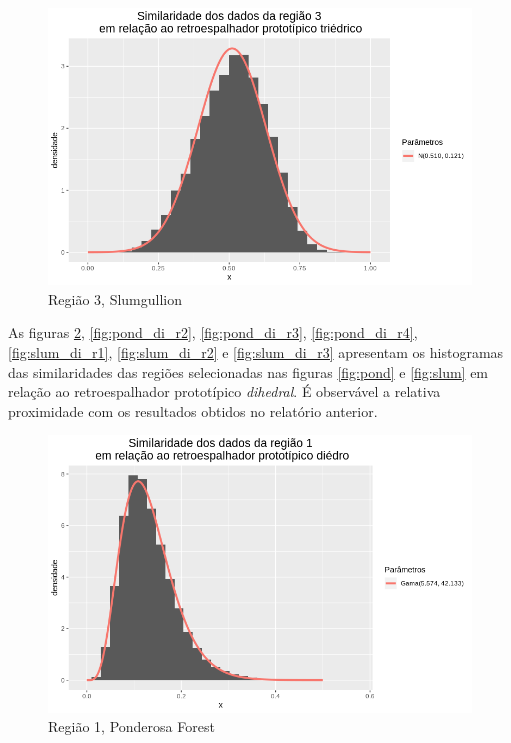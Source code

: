 \documentclass[12pt]{article}
\begin{document}
\begin{figure}[!h]
    \centering
    \includegraphics[width = \linewidth]{../../Images/Report_18_12_20/slum_tri_region3.png}
    \caption{Região 3, Slumgullion}
    \label{fig:slum_tri_r3}
\end{figure}


As figuras \ref{fig:pond_di_r1}, \ref{fig:pond_di_r2}, \ref{fig:pond_di_r3}, \ref{fig:pond_di_r4}, \ref{fig:slum_di_r1}, \ref{fig:slum_di_r2} e \ref{fig:slum_di_r3} apresentam os histogramas das similaridades das regiões selecionadas nas figuras \ref{fig:pond} e \ref{fig:slum} em relação ao retroespalhador prototípico \textit{dihedral}. É observável a relativa proximidade com os resultados obtidos no relatório anterior.

\begin{figure}[!h]
    \centering
    \vspace{0.05\linewidth}
    \includegraphics[width = \linewidth]{../../Images/Report_18_12_20/ponder_di_region1.png}
    \caption{Região 1, Ponderosa Forest}
    \label{fig:pond_di_r1}
\end{figure}
\end{document}
